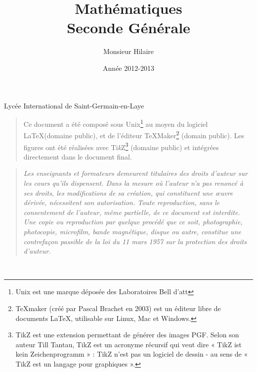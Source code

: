 

\usepackage{textcomp}

\title {  \Huge     Mathématiques\\
             Seconde Générale \\
       }

\author{ \Large   Monsieur Hilaire  }

\date  { \large  Année 2012-2013   }





\maketitle\thispagestyle{empty} %
\vfill

\centerline {\large  Lycée International de Saint-Germain-en-Laye} 

\newpage

\thispagestyle{empty}

\def\TikZ{{\fontfamily{cmr}Ti{\em k}Z}} 
    \begin {quote}
    Ce document a été composé sous  Unix\footnote{Unix  est une
    marque déposée des  Laboratoires  Bell d'{\sc att}} au moyen  
    du logiciel \LaTeX (domaine  public),
    et de l'éditeur {\TeX}{Maker}\footnote{TeXmaker (créé par Pascal Brachet en 2003) est un éditeur libre de documents LaTeX, utilisable sur Linux, Mac et Windows.} (domain public). 
    Les figures ont été réalisées avec {\TikZ}\footnote{TikZ est une extension permettant de générer des images PGF. Selon son auteur Till Tantau, TikZ est un acronyme récursif qui veut dire « TikZ ist kein Zeichenprogramm » : TikZ n'est pas un logiciel de dessin - au sens de « TikZ est un langage pour graphiques ».} (domaine
    public)  et  intégrées  directement  dans le  document  final.
    \end {quote}

    \vspace {15cm}

    \begin {quote}
    \em Les enseignants et formateurs demeurent titulaires des droits d'auteur sur les cours qu'ils dispensent.    
Dans la mesure où l'auteur n'a pas renoncé à ses droits, les modifications de sa création, qui constituent une œuvre dérivée, nécessitent son autorisation. 
    Toute  reproduction,  sans le consentement de l'auteur, 
    même  partielle,  de ce document est
    interdite.  Une copie ou reproduction  par quelque procédé que
    ce   soit,   photographie,    photocopie,   microfilm,   bande
    magnétique,   disque  ou  autre,   constitue  une  contrefaçon
    passible  de la loi du 11  mars  1957  sur la  protection  des
    droits d'auteur.
    \end {quote}
\newpage

\setcounter{page}{1}

\tableofcontents
\newpage
~ %
\newpage





